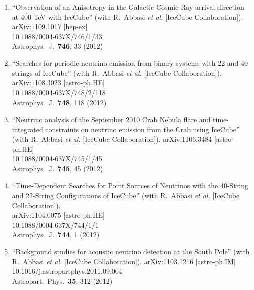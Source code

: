 \begin{enumerate}
\item ``Observation of an Anisotropy in the Galactic Cosmic
        Ray arrival   direction at 400 TeV with IceCube''
        (with R.~Abbasi {\it et al.}   [IceCube
        Collaboration]).  \\{}arXiv:1109.1017 [hep-ex]
        \\{}10.1088/0004-637X/746/1/33 \\{}Astrophys.\ J.\
        {\bf 746}, 33   (2012) %

\item ``Searches for periodic neutrino emission from binary
        systems with 22   and 40 strings of IceCube'' (with
        R.~Abbasi {\it et al.}  [IceCube
        Collaboration]).  \\{}arXiv:1108.3023 [astro-ph.HE]
        \\{}10.1088/0004-637X/748/2/118 \\{}Astrophys.\ J.\
        {\bf 748}, 118   (2012) %

\item ``Neutrino analysis of the September 2010 Crab Nebula
        flare and   time-integrated constraints on neutrino
        emission from the Crab using   IceCube'' (with
        R.~Abbasi {\it et al.}  [IceCube Collaboration]).
        arXiv:1106.3484 [astro-ph.HE]
        \\{}10.1088/0004-637X/745/1/45   \\{}Astrophys.\ J.\
        {\bf 745}, 45 (2012) %

\item ``Time-Dependent Searches for Point Sources of
        Neutrinos with the   40-String and 22-String
        Configurations of IceCube'' (with R.~Abbasi   {\it
        et al.}  [IceCube Collaboration]).
        \\{}arXiv:1104.0075   [astro-ph.HE]
        \\{}10.1088/0004-637X/744/1/1 \\{}Astrophys.\ J.\
        {\bf     744}, 1 (2012) %

\item ``Background studies for acoustic neutrino detection
        at the South   Pole'' (with R.~Abbasi {\it et al.}
        [IceCube Collaboration]). arXiv:1103.1216
        [astro-ph.IM]
        \\{}10.1016/j.astropartphys.2011.09.004
        \\{}Astropart.\ Phys.\ {\bf     35}, 312 (2012)


\end{enumerate}
